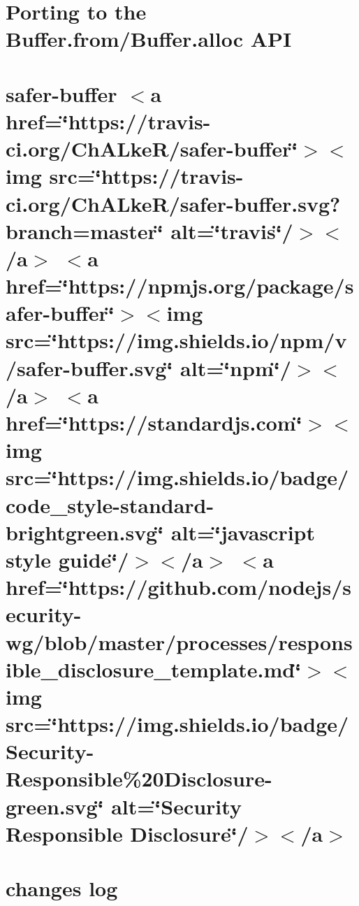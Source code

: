 \let\mypdfximage\pdfximage\def\pdfximage{\immediate\mypdfximage}\documentclass[twoside]{book}
\newcommand{\+}{\discretionary{\mbox{\scriptsize$\hookleftarrow$}}{}{}}
\begin{document}
\chapter{Porting to the Buffer.\+from/\+Buffer.alloc A\+PI}
\label{md__c_1__git_hub__p_r_o_y_e_c_t_o-_i_i_i-_g_o_t_rest-api-node-mysql_node_modules_safer-buffer__porting-_buffer}

\chapter{safer-\/buffer $<$a href=\char`\"{}https\+://travis-\/ci.\+org/\+Ch\+A\+Lke\+R/safer-\/buffer\char`\"{}$>$$<$img src=\char`\"{}https\+://travis-\/ci.\+org/\+Ch\+A\+Lke\+R/safer-\/buffer.\+svg?branch=master\char`\"{} alt=\char`\"{}travis\char`\"{}/$>$$<$/a$>$ $<$a href=\char`\"{}https\+://npmjs.\+org/package/safer-\/buffer\char`\"{}$>$$<$img src=\char`\"{}https\+://img.\+shields.\+io/npm/v/safer-\/buffer.\+svg\char`\"{} alt=\char`\"{}npm\char`\"{}/$>$$<$/a$>$ $<$a href=\char`\"{}https\+://standardjs.\+com\char`\"{}$>$$<$img src=\char`\"{}https\+://img.\+shields.\+io/badge/code\+\_\+style-\/standard-\/brightgreen.\+svg\char`\"{} alt=\char`\"{}javascript style guide\char`\"{}/$>$$<$/a$>$ $<$a href=\char`\"{}https\+://github.\+com/nodejs/security-\/wg/blob/master/processes/responsible\+\_\+disclosure\+\_\+template.\+md\char`\"{}$>$$<$img src=\char`\"{}https\+://img.\+shields.\+io/badge/\+Security-\/\+Responsible\%20\+Disclosure-\/green.\+svg\char`\"{} alt=\char`\"{}\+Security Responsible Disclosure\char`\"{}/$>$$<$/a$>$}
\label{md__c_1__git_hub__p_r_o_y_e_c_t_o-_i_i_i-_g_o_t_rest-api-node-mysql_node_modules_safer-buffer__readme}

\chapter{changes log}
\label{md__c_1__git_hub__p_r_o_y_e_c_t_o-_i_i_i-_g_o_t_rest-api-node-mysql_node_modules_semver__c_h_a_n_g_e_l_o_g}

\end{document}
